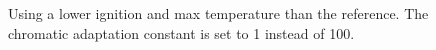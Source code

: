 \begin{figure}[h!]
\centering
{}
\caption
{
\label{fig:fire7}
Using a lower ignition and max temperature than the reference. The chromatic adaptation constant is set to 1 instead of 100.
}
\end{figure} 

